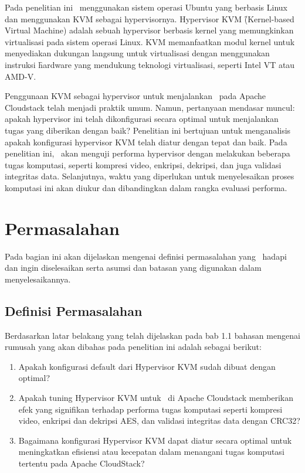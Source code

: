 Pada penelitian ini \saya\ menggunakan sistem operasi Ubuntu yang berbasis Linux dan menggunakan KVM sebagai hypervisornya. Hypervisor KVM \f{(Kernel-based Virtual Machine)} adalah sebuah hypervisor berbasis kernel yang memungkinkan virtualisasi pada sistem operasi Linux\cite{whatiskvm}. KVM memanfaatkan modul kernel untuk menyediakan dukungan langsung untuk virtualisasi dengan menggunakan instruksi \f{hardware} yang mendukung teknologi virtualisasi, seperti Intel VT atau AMD-V.

Penggunaan KVM sebagai hypervisor untuk menjalankan \vm\ pada Apache Cloudstack telah menjadi praktik umum. Namun, pertanyaan mendasar muncul: apakah hypervisor ini telah dikonfigurasi secara optimal untuk menjalankan tugas yang diberikan dengan baik? Penelitian ini bertujuan untuk menganalisis apakah konfigurasi hypervisor KVM telah diatur dengan tepat dan baik. Pada penelitian ini, \saya\ akan menguji performa hypervisor dengan melakukan beberapa tugas komputasi, seperti kompresi video, enkripsi, dekripsi, dan juga validasi integritas data. Selanjutnya, waktu yang diperlukan untuk menyelesaikan proses komputasi ini akan diukur dan dibandingkan dalam rangka evaluasi performa.


\section{Permasalahan}
Pada bagian ini akan dijelaskan mengenai definisi permasalahan yang \saya\ hadapi dan ingin diselesaikan serta asumsi dan batasan yang digunakan dalam menyelesaikannya.


\subsection{Definisi Permasalahan}
Berdasarkan latar belakang yang telah dijelaskan pada bab 1.1 bahasan mengenai rumusah yang akan dibahas pada penelitian ini adalah sebagai berikut:
\begin{enumerate}
      \item Apakah konfigurasi default dari Hypervisor KVM sudah dibuat dengan optimal?
      \item Apakah tuning Hypervisor KVM untuk \vm\ di Apache Cloudstack memberikan efek yang signifikan terhadap performa tugas komputasi seperti kompresi video, enkripsi dan dekripsi AES, dan validasi integritas data dengan CRC32?
      \item Bagaimana konfigurasi Hypervisor KVM dapat diatur secara optimal untuk meningkatkan efisiensi atau kecepatan dalam menangani tugas komputasi tertentu pada Apache CloudStack?
\end{enumerate}

